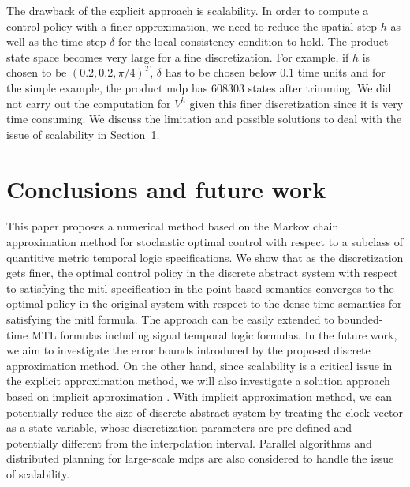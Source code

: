 \documentclass[letterpaper, 10 pt, conference]{ieeeconf}
\begin{document}
The drawback of the explicit approach is scalability. In order to
compute a control policy with a finer approximation, we need to reduce
the spatial step $h$ as well as the time step $\delta$ for the local
consistency condition to hold. The product state space becomes very
large for a fine discretization. For example, if $h$ is chosen to be
$(0.2,0.2, \pi/4)^T$, $\delta$ has to be chosen below $0.1$ time units
and for the simple example, the product \ac{mdp} has $608303$ states
after trimming. We did not carry out the computation for $V^h$ given
this finer discretization since it is very time consuming. We discuss
the limitation and possible solutions to deal with the issue of
scalability in Section~\ref{sec:conclude}. 

\section{Conclusions and future work}
\label{sec:conclude}
This paper proposes a numerical method based on the Markov chain
approximation method for stochastic optimal control with respect to a
subclass of quantitive metric temporal logic specifications. We show
that as the discretization gets finer, the optimal control policy in
the discrete abstract system with respect to satisfying the \ac{mitl}
specification in the point-based semantics converges to the optimal
policy in the original system with respect to the dense-time semantics
for satisfying the \ac{mitl} formula. The approach can be easily
extended to bounded-time MTL formulas including signal temporal logic
formulas. In the future work, we aim to investigate the error bounds
introduced by the proposed discrete approximation method. On the other
hand, since scalability is a critical issue in the explicit
approximation method, we will also investigate a solution approach
based on implicit approximation \cite{kushner2001numerical}. With
implicit approximation method, we can potentially reduce the size of
discrete abstract system by treating the clock vector as a state
variable, whose discretization parameters are pre-defined and
potentially different from the interpolation interval. Parallel
algorithms and distributed planning for large-scale \ac{mdp}s are also
considered to handle the issue of scalability.
\end{document}
